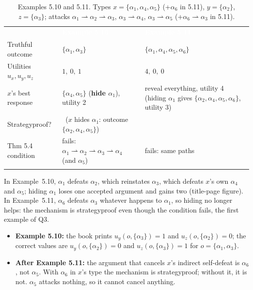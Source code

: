 \documentclass[10pt,a4paper]{article}
\newcommand{\thd}[1]{\textcolor{white}{\sffamily\bfseries #1}}
\newcommand{\yes}{\textcolor{good}{\ding{51}}}
\newcommand{\no}{\textcolor{bad}{\ding{55}}}
\newcommand{\tabend}{\arrayrulecolor{brand}\specialrule{0.8pt}{0pt}{0pt}\arrayrulecolor{black}}
\newcommand{\att}{\rightharpoonup}          %
\newcommand{\al}[1]{\alpha_{#1}}
\begin{document}
\begin{table}[H]\centering
\caption{Examples 5.10 and 5.11. Types $x=\{\al1,\al4,\al5\}$ (+$\al6$ in 5.11), $y=\{\al2\}$, $z=\{\al3\}$; attacks
$\al1\att\al2\att\al3$, $\al3\att\al4$, $\al3\att\al5$ (+$\al6\att\al3$ in 5.11).}\label{tab:ex510}
\small
\begin{tabularx}{\textwidth}{>{\raggedright\arraybackslash}p{4.0cm} X X}
\rowcolor{brand}\thd{} & \thd{Example 5.10} & \thd{Example 5.11}\\
\rowcolor{white} Truthful outcome & $\{\al1,\al3\}$ & $\{\al1,\al4,\al5,\al6\}$\\
\rowcolor{rowalt} Utilities $u_x,u_y,u_z$ & $1,\ 0,\ 1$ & $4,\ 0,\ 0$\\
\rowcolor{white} $x$'s best response & $\{\al4,\al5\}$ (\textbf{hide $\al1$}), utility 2 & reveal everything, utility 4 (hiding $\al1$ gives $\{\al2,\al4,\al5,\al6\}$, utility 3)\\
\rowcolor{rowalt} Strategyproof? & \no\ ($x$ hides $\al1$: outcome $\{\al2,\al4,\al5\}$) & \yes\\
\rowcolor{white} Thm 5.4 condition & fails: $\al1\att\al2\att\al3\att\al4$ (and $\al5$) & fails: same paths\\
\tabend
\end{tabularx}
\end{table}

In Example~5.10, $\al1$ defeats $\al2$, which reinstates $\al3$, which defeats $x$'s own $\al4$ and $\al5$; hiding $\al1$ loses one
accepted argument and gains two (title-page figure). In Example~5.11, $\al6$ defeats $\al3$ whatever happens to $\al1$, so hiding
no longer helps: the mechanism is strategyproof even though the condition fails, the first example of Q3.

\begin{notebox}\label{sec:misprints}
\begin{itemize}
  \item \textbf{Example 5.10:} the book prints $u_y(o,\{\al3\})=1$ and $u_z(o,\{\al2\})=0$; the correct values are
        $u_y(o,\{\al2\})=0$ and $u_z(o,\{\al3\})=1$ for $o=\{\al1,\al3\}$.
  \item \textbf{After Example 5.11:} the argument that cancels $x$'s indirect self-defeat is $\al6$, not $\al5$. With $\al6$ in
        $x$'s type the mechanism is strategyproof; without it, it is not. $\al5$ attacks nothing, so it cannot cancel anything.
\end{itemize}
\end{notebox}
\end{document}
